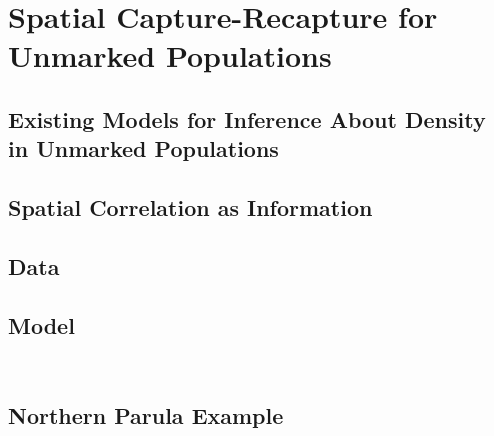 


\chapter{Spatial Capture-Recapture for Unmarked Populations}
\label{chapt.scr-unmarked}




\section{Existing Models for Inference About Density in Unmarked Populations}
\label{Sect.existing-unmarked}


\section{Spatial Correlation as Information}
\label{sect.corr-info}

\begin{figure}
\centering
\label{ch14.fig.heur}
\end{figure}


\section{Data}


\section{Model}


\begin{equation}
\label{eq.latentPoisson}
\end{equation}


\begin{equation}
\label{eq:nagg}
\end{equation}



\section{Northern Parula Example}

\begin{figure}
  \centering
   \label{fig:nopaDat}
\end{figure}



\begin{table}%
    \scriptsize
  \begin{tabular}{l l rrrrrr}
    \end{tabular}
  \label{t:nopaPosts}
\vspace{0.5cm}
\end{table}


